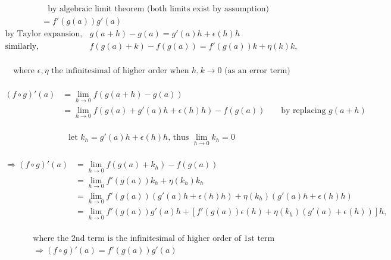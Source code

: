 \begin{itemize}
\begin{itemize}
\begin{itemize}
\begin{align*}
		&\phantom{=} \text{by algebraic limit theorem (both limits exist by assumption)} \\
		&= f'(g(a))g'(a)\end{align*}
		\Item \begin{align*} \text{by Taylor expansion, } &g(a+h)-g(a)=g'(a)h+\epsilon(h)h \\
		\text{similarly, } & f(g(a)+k)-f(g(a))=f'(g(a))k+\eta(k)k,\end{align*}
		\abovedisplayskip=0pt\abovedisplayshortskip=0pt~\vspace*{-\baselineskip}
		\begin{align*}\text{where $\epsilon, \eta$ the infinitesimal of higher order when $h,k\rightarrow 0$ (as an error term)}\end{align*}
		\abovedisplayskip=0pt\abovedisplayshortskip=0pt~\vspace*{-\baselineskip}		
		\begin{align*} (f\circ g)'(a) &= \lim_{h\rightarrow 0}f(g(a+h)-g(a)) \\
		&= \lim_{h\rightarrow 0} f(g(a)+g'(a)h+\epsilon(h)h) - f(g(a)) && \text{ by replacing } g(a+h) \end{align*}
		\abovedisplayskip=0pt\abovedisplayshortskip=0pt~\vspace*{-\baselineskip}
		\begin{align*}\text{let $k_h = g'(a)h+\epsilon(h)h$, thus $\lim_{h\rightarrow 0}k_h = 0$}\end{align*}
		\abovedisplayskip=0pt\abovedisplayshortskip=0pt~\vspace*{-\baselineskip}
		\begin{align*} \Rightarrow (f\circ g)'(a) &= \lim_{h\rightarrow 0} f(g(a)+k_h) - f(g(a)) \\
		&= \lim_{h\rightarrow 0} f'(g(a))k_h + \eta(k_h)k_h \\
		&= \lim_{h\rightarrow 0} f'(g(a))(g'(a)h+\epsilon(h)h) + \eta(k_h)(g'(a)h+\epsilon(h)h) \\
		&= \lim_{h\rightarrow 0} f'(g(a))g'(a)h + [f'(g(a))\epsilon(h) + \eta(k_h)(g'(a)+\epsilon(h))]h, \end{align*}
		\abovedisplayskip=0pt\abovedisplayshortskip=0pt~\vspace*{-\baselineskip}
		\begin{align*}&\text{where the 2nd term is the infinitesimal of higher order of 1st term } \\ 
		&\Rightarrow (f\circ g)'(a) = f'(g(a))g'(a) \end{align*}
		\end{itemize}

\end{itemize}
\end{itemize}
